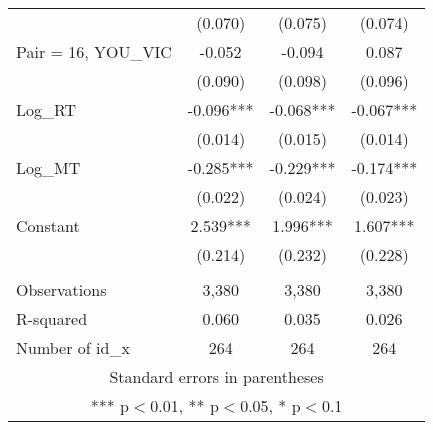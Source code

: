\documentclass[]{article}
\begin{document}
\begin{tabular}{lccc}
 & (0.070) & (0.075) & (0.074) \\
Pair = 16, YOU\_VIC & -0.052 & -0.094 & 0.087 \\
 & (0.090) & (0.098) & (0.096) \\
Log\_RT & -0.096*** & -0.068*** & -0.067*** \\
 & (0.014) & (0.015) & (0.014) \\
Log\_MT & -0.285*** & -0.229*** & -0.174*** \\
 & (0.022) & (0.024) & (0.023) \\
Constant & 2.539*** & 1.996*** & 1.607*** \\
 & (0.214) & (0.232) & (0.228) \\
 &  &  &  \\
Observations & 3,380 & 3,380 & 3,380 \\
R-squared & 0.060 & 0.035 & 0.026 \\
 Number of id\_x & 264 & 264 & 264 \\ \hline
\multicolumn{4}{c}{ Standard errors in parentheses} \\
\multicolumn{4}{c}{ *** p$<$0.01, ** p$<$0.05, * p$<$0.1} \\
\end{tabular}
\end{document}
